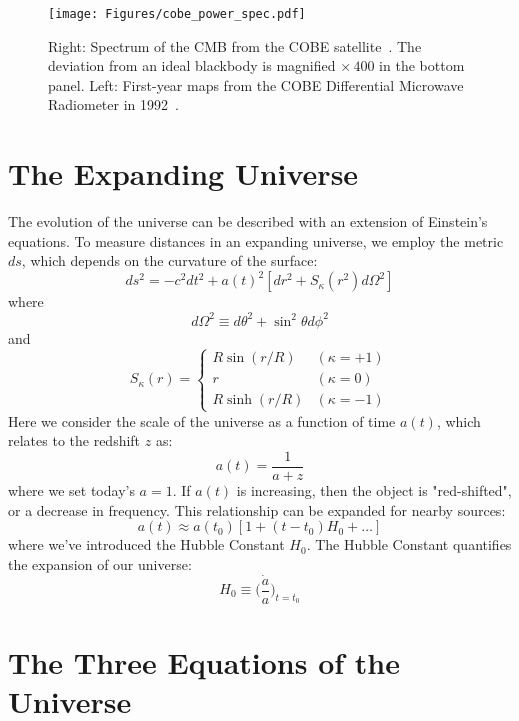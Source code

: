 \begin{figure}[t]
    \centering
    \texttt{[image: Figures/cobe\_power\_spec.pdf]}
    \caption{Right: Spectrum of the CMB from the COBE satellite~\cite{1994ApJ...420..439M}.  The deviation from an ideal blackbody is magnified $\times\,400$ in the bottom panel.  Left: First-year maps from the COBE Differential Microwave Radiometer in 1992~\cite{1992ApJ...396L...1S}.}
    \label{fig:cobe_power_spectra}
\end{figure}

\section{The Expanding Universe}
The evolution of the universe can be described with an extension of Einstein's equations.  To measure distances in an expanding universe, we employ the metric $ds$, which depends on the curvature of the surface:
\begin{equation}
    ds^2 = -c^2dt^2 + a(t)^2[dr^2 + S_\kappa (r^2)d\Omega^2]
\end{equation}
where
\begin{equation}
    d\Omega^2\equiv d\theta^2 + \sin^2\theta d\phi^2
\end{equation}
and
\begin{equation}
    S_\kappa(r) = \begin{cases} R\sin(r/R) & (\kappa = +1) \\
  r & (\kappa = 0) \\
   R\sinh(r/R) & (\kappa = -1)\end{cases}
\end{equation}
Here we consider the scale of the universe as a function of time $a(t)$, which relates to the redshift $z$ as:
\begin{equation}
    a(t) = \frac{1}{a+z}
\end{equation}
where we set today's $a=1$.  If $a(t)$ is increasing, then the object is "red-shifted", or a decrease in frequency.  This relationship can be expanded for nearby sources:
\begin{equation}
    a(t)\approx a(t_0)[1+(t-t_0)H_0+ \ldots ]
\end{equation}
where we've introduced the Hubble Constant $H_0$.  The Hubble Constant quantifies the expansion of our universe:
\begin{equation}
    H_0\equiv \bigg(\frac{\dot{a}}{a}\bigg )_{t=t_0}
\end{equation}

\section{The Three Equations of the Universe}

